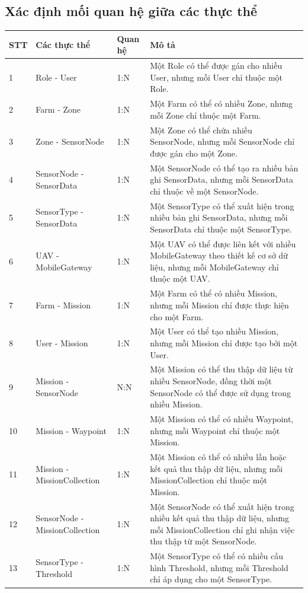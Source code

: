 \subsection{Xác định mối quan hệ giữa các thực thể}
\begin{longtable}{p{}p{}p{}p{}}
\toprule
\textbf{STT} & \textbf{Các thực thể} & \textbf{Quan hệ} & \textbf{Mô tả} \\
\midrule
1 & Role - User & 1:N & Một Role có thể được gán cho nhiều User, nhưng mỗi User chỉ thuộc một Role. \\
2 & Farm - Zone & 1:N & Một Farm có thể có nhiều Zone, nhưng mỗi Zone chỉ thuộc một Farm. \\
3 & Zone - SensorNode & 1:N & Một Zone có thể chứa nhiều SensorNode, nhưng mỗi SensorNode chỉ được gán cho một Zone. \\
4 & SensorNode - SensorData & 1:N & Một SensorNode có thể tạo ra nhiều bản ghi SensorData, nhưng mỗi SensorData chỉ thuộc về một SensorNode. \\
5 & SensorType - SensorData & 1:N & Một SensorType có thể xuất hiện trong nhiều bản ghi SensorData, nhưng mỗi SensorData chỉ thuộc một SensorType. \\
6 & UAV - MobileGateway & 1:N & Một UAV có thể được liên kết với nhiều MobileGateway theo thiết kế cơ sở dữ liệu, nhưng mỗi MobileGateway chỉ thuộc một UAV. \\
7 & Farm - Mission & 1:N & Một Farm có thể có nhiều Mission, nhưng mỗi Mission chỉ được thực hiện cho một Farm. \\
8 & User - Mission & 1:N & Một User có thể tạo nhiều Mission, nhưng mỗi Mission chỉ được tạo bởi một User. \\
9 & Mission - SensorNode & N:N & Một Mission có thể thu thập dữ liệu từ nhiều SensorNode, đồng thời một SensorNode có thể được sử dụng trong nhiều Mission. \\
10 & Mission - Waypoint & 1:N & Một Mission có thể có nhiều Waypoint, nhưng mỗi Waypoint chỉ thuộc một Mission. \\
11 & Mission - MissionCollection & 1:N & Một Mission có thể có nhiều lần hoặc kết quả thu thập dữ liệu, nhưng mỗi MissionCollection chỉ thuộc một Mission. \\
12 & SensorNode - MissionCollection & 1:N & Một SensorNode có thể xuất hiện trong nhiều kết quả thu thập dữ liệu, nhưng mỗi MissionCollection chỉ ghi nhận việc thu thập từ một SensorNode. \\
13 & SensorType - Threshold & 1:N & Một SensorType có thể có nhiều cấu hình Threshold, nhưng mỗi Threshold chỉ áp dụng cho một SensorType. \\

\end{longtable}
